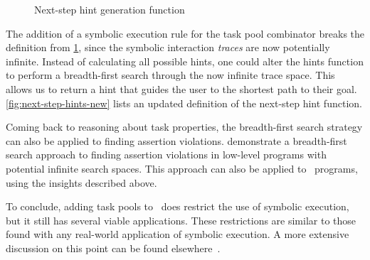 \begin{figure}
  \begin{mathpar}
  \end{mathpar}
  \caption{Next-step hint generation function}
  \label{fig:next-step-hints}
\end{figure}


The addition of a symbolic execution rule for the task pool combinator breaks the definition from \cref{fig:next-step-hints}, since the symbolic interaction \textit{traces} are now potentially infinite.
Instead of calculating all possible hints, one could alter the hints function to perform a breadth-first search through the now infinite trace space.
This allows us to return a hint that guides the user to the shortest path to their goal.
\cref{fig:next-step-hints-new} lists an updated definition of the next-step hint function.

\begin{figure*}
  \begin{mathpar}
  \end{mathpar}
  \caption{Next-step hint generation function}
  \label{fig:next-step-hints-new}
\end{figure*}


Coming back to reasoning about task properties, the breadth-first search strategy can also be applied to finding assertion violations.
\citet{DBLP:conf/tap/NausVSR23} demonstrate a breadth-first search approach to finding assertion violations in low-level programs with potential infinite search spaces.
This approach can also be applied to \DYNTOPHAT\ programs, using the insights described above.

To conclude, adding task pools to \TOPHAT\ does restrict the use of symbolic execution, but it still has several viable applications.
These restrictions are similar to those found with any real-world application of symbolic execution.
A more extensive discussion on this point can be found elsewhere~\cite{conf/ifl/NausSK19}.